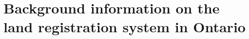 \chapter[Background]{Background information on the land registration system in Ontario} \label{ch:background}

\section{}